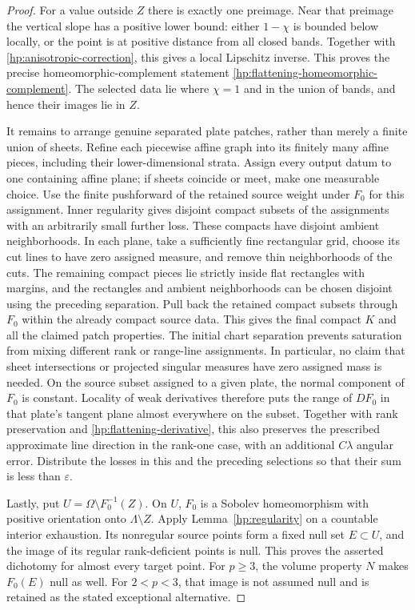 \documentclass[11pt]{article}
\numberwithin{equation}{section}
\theoremstyle{definition}
\theoremstyle{remark}
\newcommand{\eps}{\varepsilon}
\begin{document}
\begin{proof}
For a value outside $Z$ there is exactly one preimage.  Near that
preimage the vertical slope has a positive lower bound: either
$1-\chi$ is bounded below locally, or the point is at positive
distance from all closed bands.  Together with
\eqref{hp:anisotropic-correction}, this gives a local Lipschitz
inverse.  This proves the precise homeomorphic-complement statement
\eqref{hp:flattening-homeomorphic-complement}.  The selected data
lie where $\chi=1$ and in the union of bands, and hence their images
lie in $Z$.

It remains to arrange genuine separated plate patches, rather than
merely a finite union of sheets.  Refine each piecewise affine graph
into its finitely many affine pieces, including their lower-dimensional
strata.  Assign every output datum to one containing affine plane;
if sheets coincide or meet, make one measurable choice.  Use the
finite pushforward of the retained source weight under $F_0$ for
this assignment.  Inner regularity gives disjoint compact subsets
of the assignments with an arbitrarily small further loss.  These
compacts have disjoint ambient neighborhoods.  In each plane, take
a sufficiently fine rectangular grid, choose its cut lines to have
zero assigned measure, and remove thin neighborhoods of the cuts.
The remaining compact pieces lie strictly inside flat rectangles
with margins, and the rectangles and ambient neighborhoods can be
chosen disjoint using the preceding separation.  Pull back the
retained compact subsets through $F_0$ within the already compact
source data.  This gives the final compact $K$ and all the claimed
patch properties.  The initial chart separation prevents saturation
from mixing different rank or range-line assignments.  In particular,
no claim that sheet intersections or projected singular measures
have zero assigned mass is needed.  On the source subset assigned
to a given plate, the normal component of $F_0$ is constant.
Locality of weak derivatives therefore puts the range of $DF_0$
in that plate's tangent plane almost everywhere on the subset.
Together with rank preservation and
\eqref{hp:flattening-derivative}, this also preserves the prescribed
approximate line direction in the rank-one case, with an additional
$C\lambda$ angular error.  Distribute the losses in this
and the preceding selections so that their sum is less than $\eps$.

Lastly, put $U=\Omega\setminus F_0^{-1}(Z)$.  On $U$, $F_0$ is a
Sobolev homeomorphism with positive orientation onto
$\Lambda\setminus Z$.  Apply Lemma~\ref{hp:regularity} on a
countable interior exhaustion.  Its nonregular source points form
a fixed null set $E\subset U$, and the image of its regular
rank-deficient points is null.  This proves the asserted dichotomy
for almost every target point.  For $p\ge3$, the volume property
$N$ makes $F_0(E)$ null as well.  For $2<p<3$, that image is not
assumed null and is retained as the stated exceptional alternative.
\end{proof}
\end{document}
